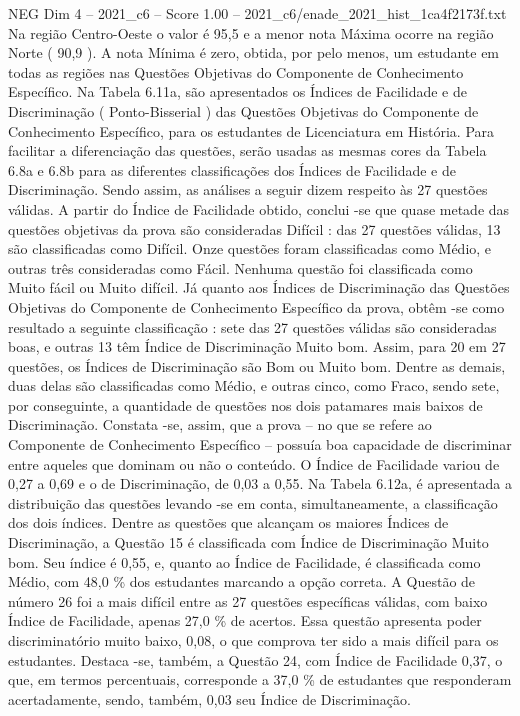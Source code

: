 \begin{textsample}{NEG Dim 4 – 2021\_c6 – Score 1.00 – 2021\_c6/enade\_2021\_hist\_1ca4f2173f.txt}
Na região Centro-Oeste o valor é 95,5 e a menor nota Máxima ocorre na região Norte ( 90,9 ).
A nota Mínima é zero, obtida, por pelo menos, um estudante em todas as regiões nas Questões Objetivas do Componente de Conhecimento Específico.
Na Tabela 6.11a, são apresentados os Índices de Facilidade e de Discriminação ( Ponto-Bisserial ) das Questões Objetivas do Componente de Conhecimento Específico, para os estudantes de Licenciatura em História.
Para facilitar a diferenciação das questões, serão usadas as mesmas cores da Tabela 6.8a e 6.8b para as diferentes classificações dos Índices de Facilidade e de Discriminação.
Sendo assim, as análises a seguir dizem respeito às 27 questões válidas.
A partir do Índice de Facilidade obtido, conclui -se que quase metade das questões objetivas da prova são consideradas Difícil : das 27 questões válidas, 13 são classificadas como Difícil.
Onze questões foram classificadas como Médio, e outras três consideradas como Fácil.
Nenhuma questão foi classificada como Muito fácil ou Muito difícil.
Já quanto aos Índices de Discriminação das Questões Objetivas do Componente de Conhecimento Específico da prova, obtêm -se como resultado a seguinte classificação : sete das 27 questões válidas são consideradas boas, e outras 13 têm Índice de Discriminação Muito bom.
Assim, para 20 em 27 questões, os Índices de Discriminação são Bom ou Muito bom.
Dentre as demais, duas delas são classificadas como Médio, e outras cinco, como Fraco, sendo sete, por conseguinte, a quantidade de questões nos dois patamares mais baixos de Discriminação.
Constata -se, assim, que a prova – no que se refere ao Componente de Conhecimento Específico – possuía boa capacidade de discriminar entre aqueles que dominam ou não o conteúdo.
O Índice de Facilidade variou de 0,27 a 0,69 e o de Discriminação, de 0,03 a 0,55.
Na Tabela 6.12a, é apresentada a distribuição das questões levando -se em conta, simultaneamente, a classificação dos dois índices.
Dentre as questões que alcançam os maiores Índices de Discriminação, a Questão 15 é classificada com Índice de Discriminação Muito bom.
Seu índice é 0,55, e, quanto ao Índice de Facilidade, é classificada como Médio, com 48,0 \% dos estudantes marcando a opção correta.
A Questão de número 26 foi a mais difícil entre as 27 questões específicas válidas, com baixo Índice de Facilidade, apenas 27,0 \% de acertos.
Essa questão apresenta poder discriminatório muito baixo, 0,08, o que comprova ter sido a mais difícil para os estudantes.
Destaca -se, também, a Questão 24, com Índice de Facilidade 0,37, o que, em termos percentuais, corresponde a 37,0 \% de estudantes que responderam acertadamente, sendo, também, 0,03 seu Índice de Discriminação.

\end{textsample}

